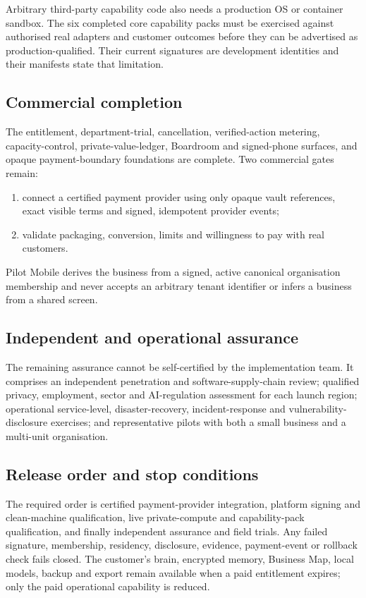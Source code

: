 Arbitrary third-party capability code also needs a production OS or container sandbox.  The six
completed core capability packs must be exercised against authorised real adapters and customer
outcomes before they can be advertised as production-qualified.  Their current signatures are
development identities and their manifests state that limitation.

\subsection{Commercial completion}

The entitlement, department-trial, cancellation, verified-action metering, capacity-control,
private-value-ledger, Boardroom and signed-phone surfaces, and opaque payment-boundary foundations
are complete.  Two commercial gates remain:
\begin{enumerate}
  \item connect a certified payment provider using only opaque vault references, exact visible
        terms and signed, idempotent provider events;
  \item validate packaging, conversion, limits and willingness to pay with real customers.
\end{enumerate}
Pilot Mobile derives the business from a signed, active canonical organisation membership and
never accepts an arbitrary tenant identifier or infers a business from a shared screen.

\subsection{Independent and operational assurance}

The remaining assurance cannot be self-certified by the implementation team.  It comprises an
independent penetration and software-supply-chain review; qualified privacy, employment, sector
and AI-regulation assessment for each launch region; operational service-level, disaster-recovery,
incident-response and vulnerability-disclosure exercises; and representative pilots with both a
small business and a multi-unit organisation.

\subsection{Release order and stop conditions}

The required order is certified payment-provider integration, platform signing and clean-machine
qualification, live private-compute and capability-pack
qualification, and finally independent assurance and field trials.  Any failed signature,
membership, residency, disclosure, evidence, payment-event or rollback check fails closed.  The
customer's brain, encrypted memory, Business Map, local models, backup and export remain available
when a paid entitlement expires; only the paid operational capability is reduced.
